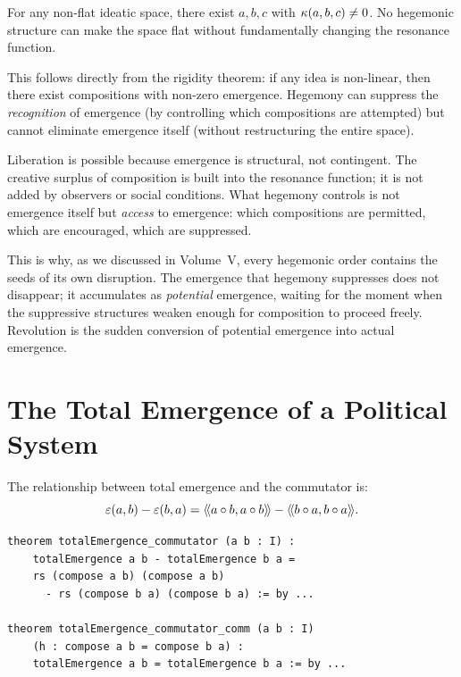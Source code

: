 \begin{theorem}
\label{thm:emergence-structural}
For any non-flat ideatic space, there exist $a, b, c$ with
$\kappa(a, b, c) \neq 0$. No hegemonic structure can make the space flat
without fundamentally changing the resonance function.
\end{theorem}

This follows directly from the rigidity theorem: if any idea is non-linear, then
there exist compositions with non-zero emergence. Hegemony can suppress the
\emph{recognition} of emergence (by controlling which compositions are attempted)
but cannot eliminate emergence itself (without restructuring the entire space).

\begin{interpretation}
Liberation is possible because emergence is structural, not contingent. The
creative surplus of composition is built into the resonance function; it is not
added by observers or social conditions. What hegemony controls is not emergence
itself but \emph{access} to emergence: which compositions are permitted, which
are encouraged, which are suppressed.

This is why, as we discussed in Volume~V, every hegemonic order contains the
seeds of its own disruption. The emergence that hegemony suppresses does not
disappear; it accumulates as \emph{potential} emergence, waiting for the moment
when the suppressive structures weaken enough for composition to proceed freely.
Revolution is the sudden conversion of potential emergence into actual emergence.
\end{interpretation}


\section{The Total Emergence of a Political System}

\begin{theorem}
\label{thm:total-emergence-commutator}
The relationship between total emergence and the commutator is:
\[
  \varepsilon(a, b) - \varepsilon(b, a) = \langle\!\langle a \circ b, a \circ b \rangle\!\rangle - \langle\!\langle b \circ a, b \circ a \rangle\!\rangle.
\]
\end{theorem}

\begin{lstlisting}[caption={Total emergence and commutator (IDT\_v3\_Emergence.lean)}]
theorem totalEmergence_commutator (a b : I) :
    totalEmergence a b - totalEmergence b a =
    rs (compose a b) (compose a b)
      - rs (compose b a) (compose b a) := by ...

theorem totalEmergence_commutator_comm (a b : I)
    (h : compose a b = compose b a) :
    totalEmergence a b = totalEmergence b a := by ...
\end{lstlisting}

